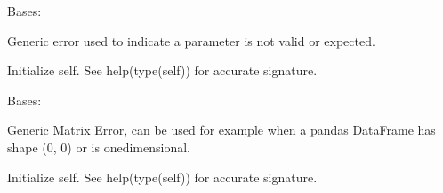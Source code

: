 \documentclass[letterpaper,10pt,english]{sphinxmanual}
\begin{document}
\begin{fulllineitems}
\label{\detokenize{app.domain.helpers:app.domain.helpers.exceptions.IllegalArgumentError}}
Bases: 

Generic error used to indicate a parameter is not valid or expected.

\begin{fulllineitems}
\label{\detokenize{app.domain.helpers:app.domain.helpers.exceptions.IllegalArgumentError.__init__}}
Initialize self.  See help(type(self)) for accurate signature.

\end{fulllineitems}


\end{fulllineitems}


\begin{fulllineitems}
\label{\detokenize{app.domain.helpers:app.domain.helpers.exceptions.MatrixError}}
Bases: 

Generic Matrix Error, can be used for example when a pandas DataFrame
has shape (0, 0) or is one\sphinxhyphen{}dimensional.

\begin{fulllineitems}
\label{\detokenize{app.domain.helpers:app.domain.helpers.exceptions.MatrixError.__init__}}
Initialize self.  See help(type(self)) for accurate signature.

\end{fulllineitems}


\end{fulllineitems}
\end{document}
